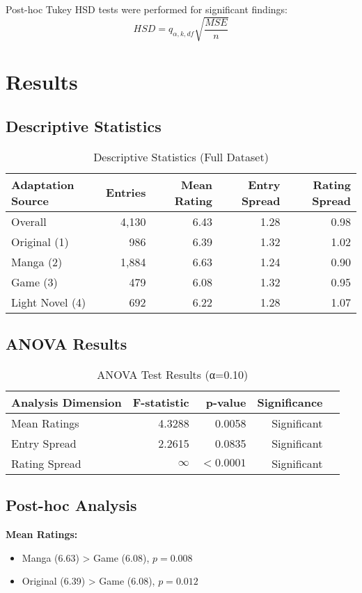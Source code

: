 \documentclass{article}
\begin{document}
Post-hoc Tukey HSD tests were performed for significant findings:
\[
HSD = q_{\alpha,k,df} \sqrt{\frac{MSE}{n}}
\]

\section{Results}

\subsection{Descriptive Statistics}
\begin{table}[H]
\centering
\caption{Descriptive Statistics (Full Dataset)}
\begin{tabular}{lrrrr}
\toprule
\textbf{Adaptation Source} & \textbf{Entries} & \textbf{Mean Rating} & \textbf{Entry Spread} & \textbf{Rating Spread} \\
\midrule
Overall & 4,130 & 6.43 & 1.28 & 0.98 \\
Original (1) & 986 & 6.39 & 1.32 & 1.02 \\
Manga (2) & 1,884 & 6.63 & 1.24 & 0.90 \\
Game (3) & 479 & 6.08 & 1.32 & 0.95 \\
Light Novel (4) & 692 & 6.22 & 1.28 & 1.07 \\
\bottomrule
\end{tabular}
\end{table}

\subsection{ANOVA Results}
\begin{table}[H]
\centering
\caption{ANOVA Test Results (α=0.10)}
\begin{tabular}{lrrrr}
\toprule
\textbf{Analysis Dimension} & \textbf{F-statistic} & \textbf{p-value} & \textbf{Significance} \\
\midrule
Mean Ratings & 4.3288 & 0.0058 & Significant \\
Entry Spread & 2.2615 & 0.0835 & Significant \\
Rating Spread & $\infty$ & $<0.0001$ & Significant \\
\bottomrule
\end{tabular}
\end{table}

\subsection{Post-hoc Analysis}
\textbf{Mean Ratings:}
\begin{itemize}
    \item Manga (6.63) > Game (6.08), $p=0.008$
    \item Original (6.39) > Game (6.08), $p=0.012$
\end{itemize}
\end{document}
